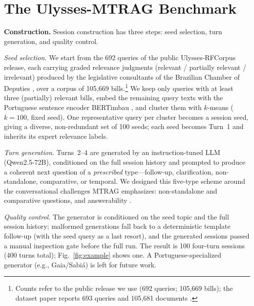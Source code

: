 \documentclass[conference]{IEEEtran}
\begin{document}
\section{The Ulysses-MTRAG Benchmark}
\label{sec:benchmark}
\textbf{Construction.} Session construction has three steps: seed selection, turn
generation, and quality control.

\emph{Seed selection.} We start from the 692 queries of the public Ulysses-RFCorpus
release, each carrying graded relevance judgments (relevant / partially relevant /
irrelevant) produced by the legislative consultants of the Brazilian Chamber of
Deputies \cite{Vitorio2024}, over a corpus of 105{,}669
bills.\footnote{Counts refer to the public release we use (692 queries;
105{,}669 bills); the dataset paper reports 693 queries and 105{,}681 documents
\cite{Vitorio2024}.} We keep only queries with at least three (partially) relevant
bills, embed the remaining query texts with the Portuguese sentence encoder
BERTimbau \cite{Souza2020BERTimbau}, and cluster them with
$k$-means ($k{=}100$, fixed seed). One representative query per cluster becomes a
session seed, giving a diverse, non-redundant set of 100 seeds; each seed becomes
Turn~1 and inherits its expert relevance labels.

\emph{Turn generation.} Turns~2--4 are generated by an instruction-tuned LLM
(Qwen2.5-72B), conditioned on the full session history and prompted to produce a
coherent next question of a \emph{prescribed} type---follow-up, clarification,
non-standalone, comparative, or temporal. We designed this five-type scheme around
the conversational challenges MTRAG emphasizes: non-standalone and comparative
questions, and answerability \cite{Katsis2025MTRAG}.

\emph{Quality control.} The generator is conditioned on the seed topic and the
full session history; malformed generations fall back to a deterministic
template follow-up (with the seed query as a last resort), and the generated
sessions passed a manual inspection gate before the full run. The result is 100
four-turn sessions (400 turns total); Fig.~\ref{fig:example} shows one. A Portuguese-specialized generator
(e.g., Gaia/Sabi\'a) is left for future work.
\end{document}

